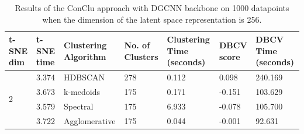 \begin{table}[H]
  \setlength\extrarowheight{10pt}
  \caption{Results of the ConClu approach with \ac{DGCNN} backbone on 1000 datapoints when the dimension of the latent space representation is 256. }
  \centering
  \begin{tabular}{|p{30pt}|p{50pt}|p{60pt}|p{50pt}|p{50pt}|p{50pt}|p{40pt}|}
    \toprule
    \ac{t-SNE} dim	& \ac{t-SNE} time & Clustering Algorithm & No. of Clusters & Clustering Time (seconds) & \ac{DBCV} score & \ac{DBCV} Time (seconds)\\
    \midrule
    \multirow{4}{30pt}{2}	& 3.374	& \ac{HDBSCAN}	& 278	& 0.112	& 0.098	& 240.169 \\ \cline{2-7} 
    & 3.673	& k-medoids	& 175	& 0.171	& -0.151	& 103.629 \\ \cline{2-7} 
    & 3.579	& Spectral	& 175	& 6.933	& -0.078	& 105.700 \\ \cline{2-7}
    & 3.722	& Agglomerative	& 175	& 0.044	& -0.001	& 92.631 \\ 
    \bottomrule
  \end{tabular}
  \label{tab:dgcnn_256}
\end{table}

